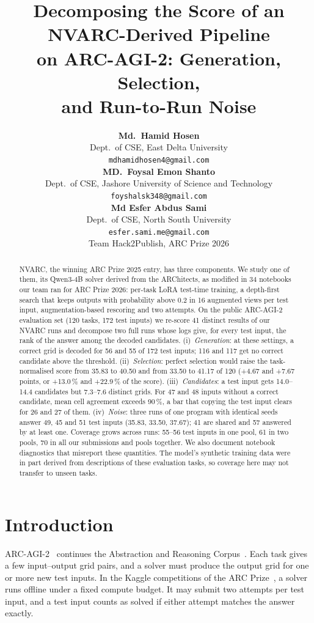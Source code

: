 \documentclass[11pt]{article}
\title{Decomposing the Score of an NVARC-Derived Pipeline\\
on ARC-AGI-2: Generation, Selection,\\
and Run-to-Run Noise}
\author{\textbf{Md.\ Hamid Hosen}\\
Dept.\ of CSE, East Delta University\\
\texttt{mdhamidhosen4@gmail.com}\\[8pt]
\textbf{MD.\ Foysal Emon Shanto}\\
Dept.\ of CSE, Jashore University of Science and Technology\\
\texttt{foyshalsk348@gmail.com}\\[8pt]
\textbf{Md Esfer Abdus Sami}\\
Dept.\ of CSE, North South University\\
\texttt{esfer.sami.me@gmail.com}\\[10pt]
\small Team Hack2Publish, ARC Prize 2026}
\date{}
\begin{document}
\maketitle

\begin{abstract}
NVARC, the winning ARC Prize 2025 entry, has three components. We study one of them, its Qwen3-4B solver derived from the ARChitects, as modified in 34 notebooks our team ran for ARC Prize 2026: per-task LoRA test-time training, a depth-first search that keeps outputs with probability above 0.2 in 16 augmented views per test input, augmentation-based rescoring and two attempts.
On the public ARC-AGI-2 evaluation set (120 tasks, 172 test inputs) we re-score 41 distinct results of our NVARC runs and decompose two full runs whose logs give, for every test input, the rank of the answer among the decoded candidates.
(i)~\emph{Generation}: at these settings, a correct grid is decoded for 56 and 55 of 172 test inputs; 116 and 117 get no correct candidate above the threshold.
(ii)~\emph{Selection}: perfect selection would raise the task-normalised score from 35.83 to 40.50 and from 33.50 to 41.17 of 120 (+4.67 and +7.67 points, or +13.0\,\% and +22.9\,\% of the score).
(iii)~\emph{Candidates}: a test input gets 14.0--14.4 candidates but 7.3--7.6 distinct grids. For 47 and 48 inputs without a correct candidate, mean cell agreement exceeds 90\,\%, a bar that copying the test input clears for 26 and 27 of them.
(iv)~\emph{Noise}: three runs of one program with identical seeds answer 49, 45 and 51 test inputs (35.83, 33.50, 37.67); 41 are shared and 57 answered by at least one.
Coverage grows across runs: 55--56 test inputs in one pool, 61 in two pools, 70 in all our submissions and pools together.
We also document notebook diagnostics that misreport these quantities.
The model's synthetic training data were in part derived from descriptions of these evaluation tasks, so coverage here may not transfer to unseen tasks.
\end{abstract}
\clearpage

\section{Introduction}

ARC-AGI-2~\citep{chollet2025arcagi2} continues the Abstraction and Reasoning Corpus~\citep{chollet2019measure}. Each task gives a few input--output grid pairs, and a solver must produce the output grid for one or more new test inputs.
In the Kaggle competitions of the ARC Prize~\citep{chollet2024arcprize,arcprize2025report,arcprize2026kaggle}, a solver runs offline under a fixed compute budget. It may submit two attempts per test input, and a test input counts as solved if either attempt matches the answer exactly.
\end{document}
